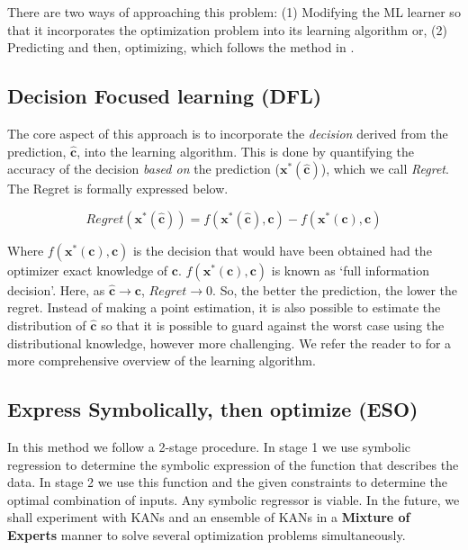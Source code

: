 \documentclass[12pt, letterpaper]{article}
\begin{document}
There are two ways of approaching this problem: (1) Modifying the ML learner so
that it incorporates the optimization problem into its learning algorithm or,
(2) Predicting and then, optimizing, which follows the method in \cite{spo}.

\subsection{Decision Focused learning (DFL)}
The core aspect of this approach is to incorporate the \textit{decision} derived
from the prediction, $\hat{\mathbf{c}}$,  into the learning algorithm. This is
done by quantifying the accuracy of the decision \textit{based on} the
prediction ($\mathbf{x}^*(\hat{\mathbf{c}})$), which we call \textit{Regret}.
The Regret is formally expressed below.

\begin{equation}
    Regret(\mathbf{x}^*(\hat{\mathbf{c}})) = f(\mathbf{x}^*(\hat{\mathbf{c}}), \mathbf{c}) - f(\mathbf{x}^*(\mathbf{c}), \mathbf{c})
\end{equation}

Where $f(\mathbf{x}^*(\mathbf{c}), \mathbf{c})$ is the decision that would have
been obtained had the optimizer exact knowledge of $\mathbf{c}$.
$f(\mathbf{x}^*(\mathbf{c}), \mathbf{c})$ is known as `full information
decision'. Here, as $\hat{\mathbf{c}} \rightarrow \mathbf{c}$, $Regret
\rightarrow 0$. So, the better the prediction, the lower the regret. Instead of
making a point estimation, it is also possible to estimate the distribution of
$\hat{\mathbf{c}}$ so that it is possible to guard against the worst case using
the distributional knowledge, however more challenging. We refer the reader to
\cite{Mandi_2024} for a more comprehensive overview of the learning algorithm.

\subsection{Express Symbolically, then optimize (ESO)}
In this method we follow a 2-stage procedure. In stage 1 we use symbolic
regression to determine the symbolic expression of the function that describes
the data. In stage 2 we use this function and the given constraints to determine
the optimal combination of inputs. Any symbolic regressor is viable. In the
future, we shall experiment with KANs and an ensemble of KANs in a
\textbf{Mixture of Experts} \cite{masoudnia_mixture_2014} manner to solve
several optimization problems simultaneously.
\end{document}
